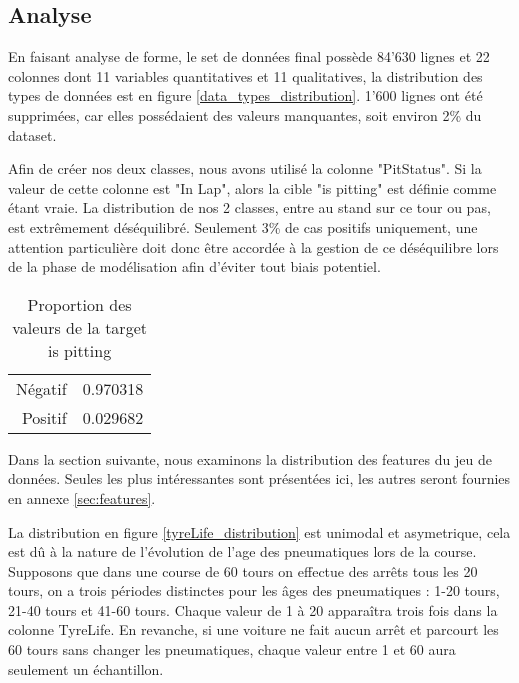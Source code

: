 \subsection{Analyse}

En faisant analyse de forme, le set de données final possède 84'630 lignes et 22 colonnes dont 11 variables quantitatives et 11 qualitatives, la distribution des types de données est en figure \ref{data_types_distribution}.
1'600 lignes ont été supprimées, car elles possédaient des valeurs manquantes, soit environ 2\% du dataset.

Afin de créer nos deux classes, nous avons utilisé la colonne "PitStatus". Si la valeur de cette colonne est "In Lap", alors la cible "is pitting" est définie comme étant vraie.
La distribution de nos 2 classes, entre au stand sur ce tour ou pas, est extrêmement déséquilibré.
Seulement 3\% de cas positifs uniquement, une attention particulière doit donc être accordée à la gestion de ce déséquilibre
lors de la phase de modélisation afin d'éviter tout biais potentiel.

\begin{table}[H]
    \begin{center}
        \caption{Proportion des valeurs de la target is pitting}
        \begin{tabular}{r|l}
            Négatif & 0.970318 \\
            Positif & 0.029682
        \end{tabular}
    \end{center}
\end{table}

Dans la section suivante, nous examinons la distribution des features du jeu de données.
Seules les plus intéressantes sont présentées ici, les autres seront fournies en annexe \ref{sec:features}.

La distribution en figure \ref{tyreLife_distribution} est unimodal et asymetrique, cela est dû à la nature de l'évolution de l'age des pneumatiques lors de la course.
Supposons que dans une course de 60 tours on effectue des arrêts tous les 20 tours, on a trois périodes distinctes pour les âges des pneumatiques : 1-20 tours, 21-40 tours et 41-60 tours.
Chaque valeur de 1 à 20 apparaîtra trois fois dans la colonne TyreLife.
En revanche, si une voiture ne fait aucun arrêt et parcourt les 60 tours sans changer les pneumatiques, chaque valeur entre 1 et 60 aura seulement un échantillon.

